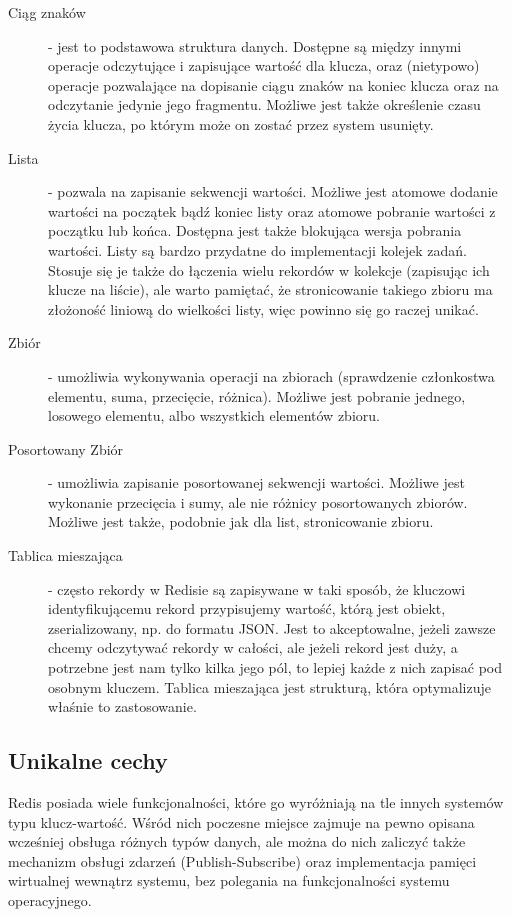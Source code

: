 \begin{description}
 \item[Ciąg znaków] - jest to podstawowa struktura danych.
 Dostępne są między innymi operacje odczytujące i zapisujące wartość dla klucza, oraz (nietypowo) operacje pozwalające na dopisanie ciągu znaków na koniec klucza oraz na odczytanie jedynie jego fragmentu.
 Możliwe jest także określenie czasu życia klucza, po którym może on zostać przez system usunięty.

 \item[Lista] - pozwala na zapisanie sekwencji wartości.
 Możliwe jest atomowe dodanie wartości na początek bądź koniec listy oraz atomowe pobranie wartości z początku lub końca.
 Dostępna jest także blokująca wersja pobrania wartości.
 Listy są bardzo przydatne do implementacji kolejek zadań.
 Stosuje się je także do łączenia wielu rekordów w kolekcje (zapisując ich klucze na liście), ale warto pamiętać, że stronicowanie takiego zbioru ma złożoność liniową do wielkości listy, więc powinno się go raczej unikać.

 \item[Zbiór] - umożliwia wykonywania operacji na zbiorach (sprawdzenie członkostwa elementu, suma, przecięcie, różnica).
 Możliwe jest pobranie jednego, losowego elementu, albo wszystkich elementów zbioru.

 \item[Posortowany Zbiór] - umożliwia zapisanie posortowanej sekwencji wartości.
 Możliwe jest wykonanie przecięcia i sumy, ale nie różnicy posortowanych zbiorów.
 Możliwe jest także, podobnie jak dla list, stronicowanie zbioru.

 \item[Tablica mieszająca] - często rekordy w Redisie są zapisywane w taki sposób, że kluczowi identyfikującemu rekord przypisujemy wartość, którą jest obiekt, zserializowany, np. do formatu JSON.
 Jest to akceptowalne, jeżeli zawsze chcemy odczytywać rekordy w całości, ale jeżeli rekord jest duży, a potrzebne jest nam tylko kilka jego pól, to lepiej każde z nich zapisać pod osobnym kluczem.
 Tablica mieszająca jest strukturą, która optymalizuje właśnie to zastosowanie.
\end{description}

\subsection*{Unikalne cechy}

Redis posiada wiele funkcjonalności, które go wyróżniają na tle innych systemów typu klucz-wartość.
Wśród nich poczesne miejsce zajmuje na pewno opisana wcześniej obsługa różnych typów danych, ale można do nich zaliczyć także mechanizm obsługi zdarzeń (Publish-Subscribe) oraz implementacja pamięci wirtualnej wewnątrz systemu, bez polegania na funkcjonalności systemu operacyjnego.

